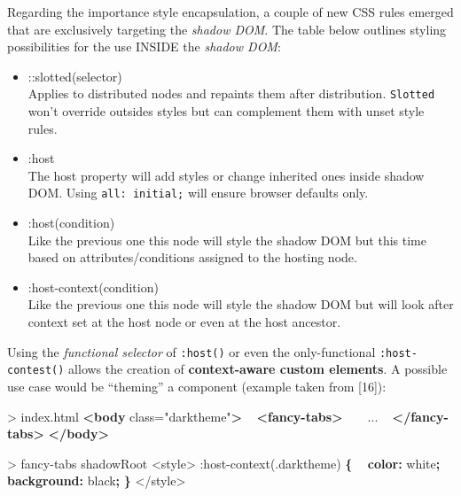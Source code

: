 \documentclass[]{article}
\newenvironment{Shaded}{}{}
\newcommand{\KeywordTok}[1]{\textcolor[rgb]{0.00,0.44,0.13}{\textbf{{#1}}}}
\newcommand{\DataTypeTok}[1]{\textcolor[rgb]{0.56,0.13,0.00}{{#1}}}
\newcommand{\DecValTok}[1]{\textcolor[rgb]{0.25,0.63,0.44}{{#1}}}
\newcommand{\FloatTok}[1]{\textcolor[rgb]{0.25,0.63,0.44}{{#1}}}
\newcommand{\StringTok}[1]{\textcolor[rgb]{0.25,0.44,0.63}{{#1}}}
\newcommand{\OtherTok}[1]{\textcolor[rgb]{0.00,0.44,0.13}{{#1}}}
\newcommand{\ErrorTok}[1]{\textcolor[rgb]{1.00,0.00,0.00}{\textbf{{#1}}}}
\newcommand{\NormalTok}[1]{{#1}}
\providecommand{\tightlist}{%
  \setlength{\itemsep}{0pt}\setlength{\parskip}{0pt}}
\begin{document}
Regarding the importance style encapsulation, a couple of new CSS rules
emerged that are exclusively targeting the \emph{shadow DOM}. The table
below outlines styling possibilities for the use INSIDE the \emph{shadow
DOM}:

\begin{itemize}
\tightlist
\item
  ::slotted(selector)\\
  Applies to distributed nodes and repaints them after distribution.
  \texttt{Slotted} won't override outsides styles but can complement
  them with unset style rules.
\item
  :host\\
  The host property will add styles or change inherited ones inside
  shadow DOM. Using \texttt{all:\ initial;} will ensure browser defaults
  only.
\item
  :host(condition)\\
  Like the previous one this node will style the shadow DOM but this
  time based on attributes/conditions assigned to the hosting node.
\item
  :host-context(condition)\\
  Like the previous one this node will style the shadow DOM but will
  look after context set at the host node or even at the host ancestor.
\end{itemize}

Using the \emph{functional selector} of \texttt{:host()} or even the
only-functional \texttt{:host-contest()} allows the creation of
\textbf{context-aware custom elements}. A possible use case would be
``theming'' a component (example taken from {[}16{]}):

\begin{Shaded}
\begin{Highlighting}[]
\NormalTok{> index.html}
\KeywordTok{<body}\OtherTok{ class=}\StringTok{"darktheme"}\KeywordTok{>}
  \KeywordTok{<fancy-tabs>}
    \NormalTok{...}
  \KeywordTok{</fancy-tabs>}
\KeywordTok{</body>}
\end{Highlighting}
\end{Shaded}

\begin{Shaded}
\begin{Highlighting}[]
\NormalTok{> fancy-tabs shadowRoot}
\NormalTok{<style>}
\DecValTok{:}\NormalTok{host-context(}\FloatTok{.darktheme}\NormalTok{) }\KeywordTok{\{}
\ErrorTok{ } \KeywordTok{color:} \DataTypeTok{white}\KeywordTok{;}
\ErrorTok{ } \KeywordTok{background:} \DataTypeTok{black}\KeywordTok{;}
\KeywordTok{\}}
\NormalTok{</style>}
\end{Highlighting}
\end{Shaded}
\end{document}
